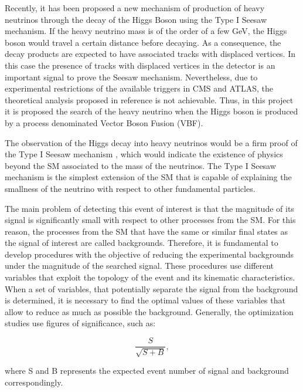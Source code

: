 Recently, it has been proposed a new mechanism of production of heavy neutrinos through the decay of the Higgs Boson \cite{Seesaw Mechanism with displaced vertices} using the Type I Seesaw mechanism. If the heavy neutrino mass is of the order of a few GeV, the Higgs boson would travel a certain distance before decaying. As a consequence, the decay products are expected to have associated tracks with displaced vertices. In this case the presence of tracks with displaced vertices in the detector is an important signal to prove the Seesaw mechanism. Nevertheless, due to experimental restrictions of the available triggers in CMS and ATLAS, the theoretical analysis proposed in reference \cite{Seesaw Mechanism with displaced vertices} is not achievable. Thus, in this project it is proposed the search of the heavy neutrino when the Higgs boson is produced by a process denominated Vector Boson Fusion (VBF).

The observation of the Higgs decay into heavy neutrinos would be a firm proof of the Type I Seesaw mechanism \cite{Type I Seesaw Mechanism}, which would indicate the existence of physics beyond the SM associated to the mass of the neutrinos. The Type I Seesaw mechanism is the simplest extension of the SM that is capable of explaining the smallness of the neutrino with respect to other fundamental particles. 

The main problem of detecting this event of interest is that the magnitude of its signal is significantly small with respect to other processes from the SM. For this reason, the processes from the SM that have the same or similar final states as the signal of interest are called backgrounds. Therefore, it is fundamental to develop procedures with the objective of reducing the experimental backgrounds under the magnitude of the searched signal. These procedures use different variables that exploit the topology of the event and its kinematic characteristics. When a set of variables, that potentially separate the signal from the background is determined, it is necessary to find the optimal values of these variables that allow to reduce as much as possible the background. Generally, the optimization studies use figures of significance, such as: 

\begin{equation}
    \frac{S}{\sqrt{S+B}},
\end{equation}

where S and B represents the expected event number of signal and background correspondingly.

